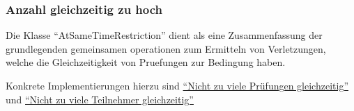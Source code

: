 \subsubsection{Anzahl gleichzeitig zu hoch}\label{subsubsec:anzahl-gleichzeitig-zu-hoch}
Die Klasse \enquote{AtSameTimeRestriction} dient als eine Zusammenfassung der grundlegenden
gemeinsamen operationen zum Ermitteln von Verletzungen, welche die Gleichzeitigkeit von Pruefungen
zur Bedingung haben.

Konkrete Implementierungen hierzu sind
\hyperref[subsubsec:nicht-zu-viele-pruefungen-gleichzeitig]{\enquote{Nicht zu viele Prüfungen gleichzeitig}}
und
\hyperref[subsubsec:nicht-zu-viele-teilnehmer-gleichzeitig]{\enquote{Nicht zu viele Teilnehmer gleichzeitig}}
